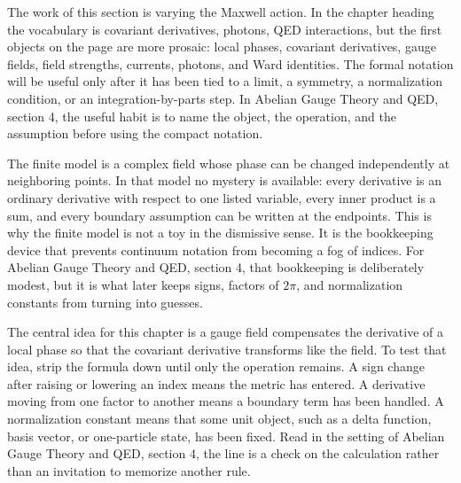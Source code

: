 











The work of this section is varying the Maxwell action.  In the chapter heading the vocabulary is covariant derivatives, photons, QED interactions, but the first objects on the page are more prosaic: local phases, covariant derivatives, gauge fields, field strengths, currents, photons, and Ward identities.  The formal notation will be useful only after it has been tied to a limit, a symmetry, a normalization condition, or an integration-by-parts step.  In Abelian Gauge Theory and QED, section 4, the useful habit is to name the object, the operation, and the assumption before using the compact notation.

The finite model is a complex field whose phase can be changed independently at neighboring points.  In that model no mystery is available: every derivative is an ordinary derivative with respect to one listed variable, every inner product is a sum, and every boundary assumption can be written at the endpoints.  This is why the finite model is not a toy in the dismissive sense.  It is the bookkeeping device that prevents continuum notation from becoming a fog of indices.  For Abelian Gauge Theory and QED, section 4, that bookkeeping is deliberately modest, but it is what later keeps signs, factors of \(2\pi\), and normalization constants from turning into guesses.

The central idea for this chapter is a gauge field compensates the derivative of a local phase so that the covariant derivative transforms like the field.  To test that idea, strip the formula down until only the operation remains.  A sign change after raising or lowering an index means the metric has entered.  A derivative moving from one factor to another means a boundary term has been handled.  A normalization constant means that some unit object, such as a delta function, basis vector, or one-particle state, has been fixed.  Read in the setting of Abelian Gauge Theory and QED, section 4, the line is a check on the calculation rather than an invitation to memorize another rule.

